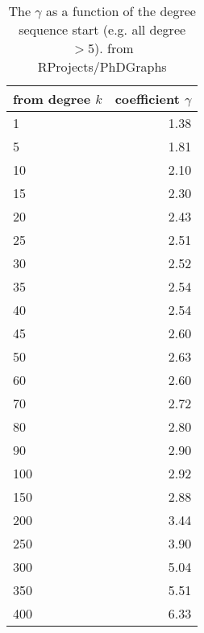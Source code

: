 \begin{table}[ht]
\centering
\begin{tabular}{lr}
  \hline
  from degree $k$ & coefficient $\gamma$ \\ 
  \hline
1 & 1.38 \\ 
  5 & 1.81 \\ 
  10 & 2.10 \\ 
  15 & 2.30 \\ 
  20 & 2.43 \\ 
  25 & 2.51 \\ 
   30 & 2.52 \\ 
  35 & 2.54 \\ 
   40 & 2.54 \\ 
   45 & 2.60 \\ 
  50 & 2.63 \\ 
   60 & 2.60 \\ 
   70 & 2.72 \\ 
   80 & 2.80 \\ 
   90 & 2.90 \\ 
   100 & 2.92 \\ 
  150 & 2.88 \\ 
   200 & 3.44 \\ 
   250 & 3.90 \\ 
  300 & 5.04 \\ 
   350 & 5.51 \\ 
   400 & 6.33 \\ 
   \hline
\end{tabular}
\caption{The $\gamma$ as a function of the degree sequence start (e.g. all degree $>5$). from RProjects/PhDGraphs}
  \label{table:gamma}
\end{table}